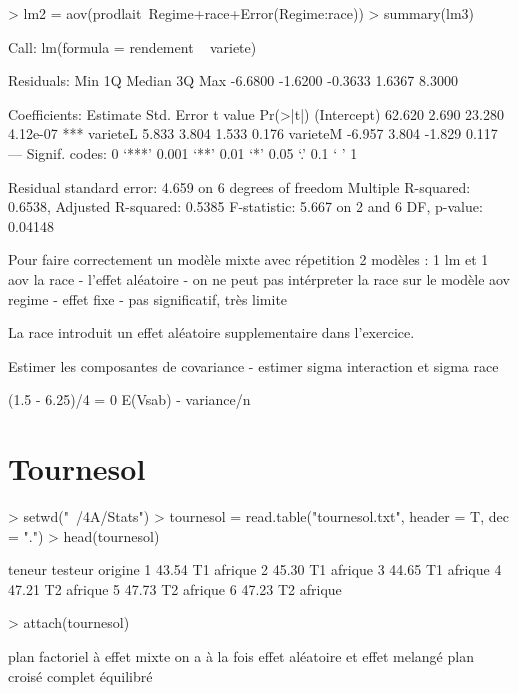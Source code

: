 \documentclass{article}
\begin{document}
\begin{Schunk}
\begin{Sinput}
> lm2 = aov(prodlait~Regime+race+Error(Regime:race))
> summary(lm3)
\end{Sinput}
\begin{Soutput}
Call:
lm(formula = rendement ~ variete)

Residuals:
    Min      1Q  Median      3Q     Max 
-6.6800 -1.6200 -0.3633  1.6367  8.3000 

Coefficients:
            Estimate Std. Error t value Pr(>|t|)    
(Intercept)   62.620      2.690  23.280 4.12e-07 ***
varieteL       5.833      3.804   1.533    0.176    
varieteM      -6.957      3.804  -1.829    0.117    
---
Signif. codes:  0 ‘***’ 0.001 ‘**’ 0.01 ‘*’ 0.05 ‘.’ 0.1 ‘ ’ 1

Residual standard error: 4.659 on 6 degrees of freedom
Multiple R-squared:  0.6538,	Adjusted R-squared:  0.5385 
F-statistic: 5.667 on 2 and 6 DF,  p-value: 0.04148
\end{Soutput}
\end{Schunk}
Pour faire correctement un modèle mixte avec répetition
2 modèles : 1 lm et 1 aov
la race - l'effet aléatoire - on ne peut pas intérpreter la race sur le modèle aov
regime - effet fixe - pas significatif, très limite

La race introduit un effet aléatoire supplementaire dans l'exercice.

Estimer les composantes de covariance - estimer sigma interaction et sigma race

(1.5 - 6.25)/4 = 0
E(Vsab) - variance/n


\section{Tournesol}
\begin{Schunk}
\begin{Sinput}
> setwd("~/4A/Stats")
> tournesol = read.table("tournesol.txt", header = T, dec = ".")
> head(tournesol)
\end{Sinput}
\begin{Soutput}
  teneur testeur origine
1  43.54      T1 afrique
2  45.30      T1 afrique
3  44.65      T1 afrique
4  47.21      T2 afrique
5  47.73      T2 afrique
6  47.23      T2 afrique
\end{Soutput}
\begin{Sinput}
> attach(tournesol)
\end{Sinput}
\end{Schunk}
plan factoriel à effet mixte
on a à la fois effet aléatoire et effet melangé
plan croisé complet équilibré
\end{document}

